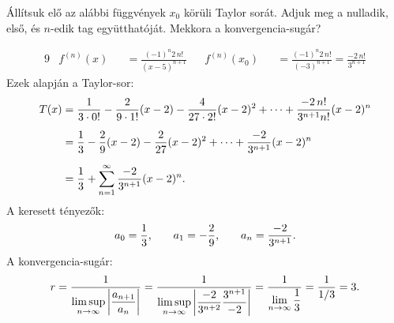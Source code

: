 \begin{exercise}{%
    Állítsuk elő az alábbi függvények $x_0$ körüli Taylor sorát.
    Adjuk meg a nulladik, első, és $n$-edik tag együtthatóját. Mekkora a
    konvergencia-sugár?
  }
{\begin{enumerate}[a)]
\begin{alignat*}{9}
               & f^{(n)}(x) &  & = \frac{(-1)^n 2 \, n!}{(x-5)^{n+1}} &  & f^{(n)}(x_0) &  & = \frac{(-1)^n 2 \, n!}{(-3)^{n+1}} = \frac{-2 \, n!}{3^{n+1}}
            \end{alignat*}
            Ezek alapján a Taylor-sor:
            \begin{align*}
              T(x)
               & = \frac{1}{3 \cdot 0!}
              - \frac{2}{9 \cdot 1!} (x - 2)
              - \frac{4}{27\cdot 2!} (x - 2)^2
              + \dots
              + \frac{-2 \, n!}{3^{n+1} n!} (x - 2)^n
              \\[2mm]
               & = \frac{1}{3}
              - \frac{2}{9} (x - 2)
              - \frac{2}{27} (x - 2)^2
              + \dots
              + \frac{-2}{3^{n+1}} (x - 2)^n
              \\[2mm]
               & = \frac{1}{3}
              + \sum_{n = 1}^\infty \frac{-2}{3^{n+1}} (x - 2)^n
              \text.
            \end{align*}
            A keresett tényezők:
            \[
              a_0 = \frac{1}{3}
              \text, \qquad
              a_1 = -\frac{2}{9}
              \text, \qquad
              a_n = \frac{-2}{3^{n+1}}
              \text.
            \]
            A konvergencia-sugár:
            \[
              r
              = \frac{1}{\displaystyle\limsup_{n \rightarrow \infty} \left|
                \dfrac{a_{n+1}}{a_n}
                \right|
              }
              = \frac{1}{\displaystyle\limsup_{n \rightarrow \infty} \left|
                \dfrac{-2}{3^{n+2}} \dfrac{3^{n+1}}{-2}
                \right|
              }
              = \frac{1}{\displaystyle\lim_{n \rightarrow \infty}\dfrac{1}{3}}
              = \frac{1}{1/3}
              = 3
              \text.
            \]


\end{enumerate}}
\end{exercise}
